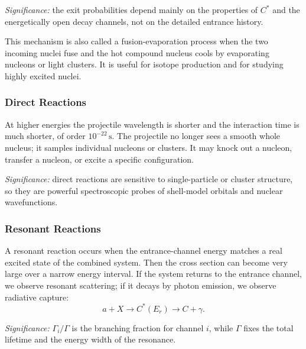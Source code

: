 \textit{Significance:} the exit probabilities depend mainly on the properties of
$C^\ast$ and the energetically open decay channels, not on the detailed entrance
history.

This mechanism is also called a fusion-evaporation process when the two incoming
nuclei fuse and the hot compound nucleus cools by evaporating nucleons or light
clusters. It is useful for isotope production and for studying highly excited
nuclei.

\subsubsection*{Direct Reactions}
At higher energies the projectile wavelength is shorter and the interaction time
is much shorter, of order $10^{-22}\,\text{s}$. The projectile no longer sees a
smooth whole nucleus; it samples individual nucleons or clusters. It may knock
out a nucleon, transfer a nucleon, or excite a specific configuration.

\textit{Significance:} direct reactions are sensitive to single-particle or
cluster structure, so they are powerful spectroscopic probes of shell-model
orbitals and nuclear wavefunctions.

\subsubsection*{Resonant Reactions}
A resonant reaction occurs when the entrance-channel energy matches a real
excited state of the combined system. Then the cross section can become very
large over a narrow energy interval. If the system returns to the entrance
channel, we observe resonant scattering; if it decays by photon emission, we
observe radiative capture:
\begin{equation}
  \label{eq:lec10:resonance_capture}
  a+X \longrightarrow C^\ast(E_r) \longrightarrow C+\gamma.
\end{equation}

\textit{Significance:} $\Gamma_i/\Gamma$ is the branching fraction for channel
$i$, while $\Gamma$ fixes the total lifetime and the energy width of the
resonance.

